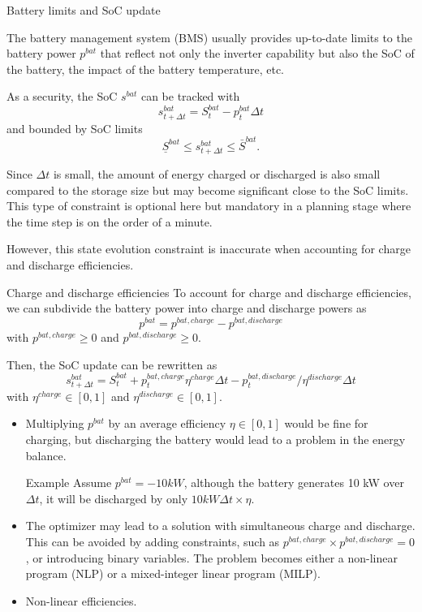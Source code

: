 \begin{frame}[allowframebreaks]{Battery limits and SoC update}

    The battery management system (BMS) usually provides up-to-date limits to the battery power $p^{bat}$ that reflect not only the inverter capability but also the SoC of the battery, the impact of the battery temperature, etc.
    
    As a security, the SoC $s^{bat}$ can be tracked with 
    $$s^{bat}_{t+\Delta t} = S^{bat}_{t} - p^{bat}_t  \Delta t$$
    and bounded by SoC limits
    $$ \underline{S}^{bat} \leq s^{bat}_{t+\Delta t} \leq \bar{S}^{bat}.$$

    Since $\Delta t$ is small, the amount of energy charged or discharged is also small compared to the storage size but may become significant close to the SoC limits.
    This type of constraint is optional here but mandatory in a planning stage where the time step is on the order of a minute.

    However, this state evolution constraint is inaccurate when accounting for charge and discharge efficiencies.
\end{frame}

\begin{frame}[allowframebreaks]{Charge and discharge efficiencies}
    To account for charge and discharge efficiencies, we can subdivide the battery power into charge and discharge powers as 
    $$ p^{bat} = p^{bat, charge} - p^{bat, discharge}$$
    with $p^{bat, charge} \geq 0$ and $p^{bat, discharge} \geq 0$.

    Then, the SoC update can be rewritten as
    $$s^{bat}_{t+\Delta t} = S^{bat}_{t} + p^{bat, charge}_t  \eta^{charge} \Delta t - p^{bat, discharge}_t / \eta^{discharge} \Delta t $$
    with $\eta^{charge} \in [0,1]$ and $\eta^{discharge} \in [0,1]$.

    \begin{itemize}
        \item Multiplying $p^{bat}$ by an average efficiency $\eta \in [0,1]$ would be fine for charging, but discharging the battery would lead to a problem in the energy balance.
        \begin{block}{Example}
            Assume $p^{bat} = -10 kW$, although the battery generates 10 kW over $\Delta t$, it will be discharged by only $10 kW \Delta t \times \eta$.    
        \end{block}
        \item The optimizer may lead to a solution with simultaneous charge and discharge. 
        This can be avoided by adding constraints, such as $p^{bat, charge} \times p^{bat, discharge} = 0$, or introducing binary variables. The problem becomes either a non-linear program (NLP) or a mixed-integer linear program (MILP).
        \item Non-linear efficiencies.
    \end{itemize}
\end{frame}

